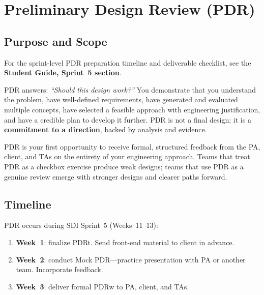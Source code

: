 \chapter{Preliminary Design Review (PDR)}

\section{Purpose and Scope}

\begin{tipbox}
For the sprint-level PDR preparation timeline and deliverable checklist, see the \textbf{Student Guide, Sprint~5 section}.
\end{tipbox}

PDR answers: \emph{``Should this design work?''} You demonstrate that you understand the problem, have well-defined requirements, have generated and evaluated multiple concepts, have selected a feasible approach with engineering justification, and have a credible plan to develop it further. PDR is not a final design; it is a \textbf{commitment to a direction}, backed by analysis and evidence.

PDR is your first opportunity to receive formal, structured feedback from the PA, client, and TAs on the entirety of your engineering approach. Teams that treat PDR as a checkbox exercise produce weak designs; teams that use PDR as a genuine review emerge with stronger designs and clearer paths forward.

\section{Timeline}
PDR occurs during SDI Sprint~5 (Weeks~11--13):
\begin{enumerate}[nosep,leftmargin=1.5em]
\item \textbf{Week~1}: finalize PDRt. Send front-end material to client in advance.
\item \textbf{Week~2}: conduct Mock PDR---practice presentation with PA or another team. Incorporate feedback.
\item \textbf{Week~3}: deliver formal PDRw to PA, client, and TAs.
\end{enumerate}

